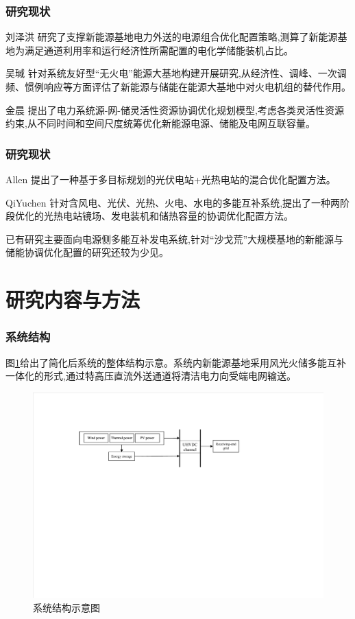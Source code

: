 \documentclass{beamer}
\begin{document}
\begin{frame}
	\frametitle{研究现状} 
	\qquad 刘泽洪 研究了支撑新能源基地电力外送的电源组合优化配置策略,测算了新能源基地为满足通道利用率和运行经济性所需配置的电化学储能装机占比。

	\qquad 吴瑊 针对系统友好型“无火电”能源大基地构建开展研究,从经济性、调峰、一次调频、惯例响应等方面评估了新能源与储能在能源大基地中对火电机组的替代作用。
	
	\qquad 金晨 提出了电力系统源-网-储灵活性资源协调优化规划模型,考虑各类灵活性资源约束,从不同时间和空间尺度统筹优化新能源电源、储能及电网互联容量。
\end{frame}

\begin{frame}
	\frametitle{研究现状} 
	\qquad Allen 提出了一种基于多目标规划的光伏电站+光热电站的混合优化配置方法。
	
	\qquad QiYuchen 针对含风电、光伏、光热、火电、水电的多能互补系统,提出了一种两阶段优化的光热电站镜场、发电装机和储热容量的协调优化配置方法。

	\qquad 已有研究主要面向电源侧多能互补发电系统,针对“沙戈荒”大规模基地的新能源与储能协调优化配置的研究还较为少见。
\end{frame}

\section{研究内容与方法}

\begin{frame}
	\frametitle{系统结构} 
	\qquad 图\ref*{fig.1}给出了简化后系统的整体结构示意。系统内新能源基地采用风光火储多能互补一体化的形式,通过特高压直流外送通道将清洁电力向受端电网输送。
	\begin{figure}[htbp]  
		\centering  
		\includegraphics[scale=0.6]{./pic/系统结构示意图.pdf}
		\caption{系统结构示意图}
		\label{fig.1}
	\end{figure}
\end{frame}
\end{document}
